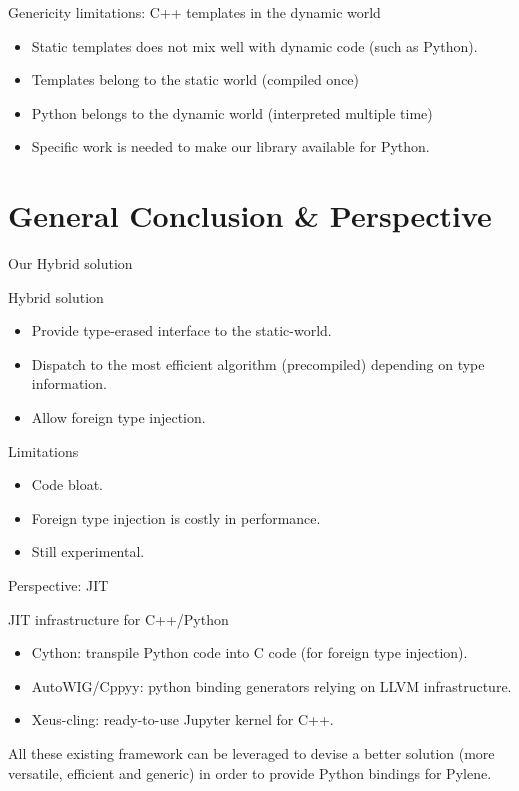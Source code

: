 \documentclass[12pt,aspectratio=169]{beamer}
\begin{document}
\begin{frame}[fragile]{Genericity limitations: C++ templates in the dynamic world}
  \begin{itemize}
    \item Static templates does not mix well with dynamic code (such as Python).
    \item Templates belong to the static world (compiled once)
    \item Python belongs to the dynamic world (interpreted multiple time)
    \item Specific work is needed to make our library available for Python.
  \end{itemize}
\end{frame}

%
%
%
\section{General Conclusion \& Perspective}

\begin{frame}{Our Hybrid solution}
  \begin{alertblock}{Hybrid solution}
    \begin{itemize}
      \item Provide type-erased interface to the static-world.
      \item Dispatch to the most efficient algorithm (precompiled) depending on type information.
      \item Allow foreign type injection.
    \end{itemize}
  \end{alertblock}
  \begin{alertblock}{Limitations}
    \begin{itemize}
      \item Code bloat.
      \item Foreign type injection is costly in performance.
      \item Still experimental.
    \end{itemize}
  \end{alertblock}
\end{frame}

\begin{frame}{Perspective: JIT}
  \begin{alertblock}{JIT infrastructure for C++/Python}
    \begin{itemize}
      \item Cython: transpile Python code into C code (for foreign type injection).
      \item AutoWIG/Cppyy: python binding generators relying on LLVM infrastructure.
      \item Xeus-cling: ready-to-use Jupyter kernel for C++.
    \end{itemize}
  \end{alertblock}
  All these existing framework can be leveraged to devise a better solution (more versatile, efficient and generic) in
  order to provide Python bindings for Pylene.
\end{frame}
\end{document}
